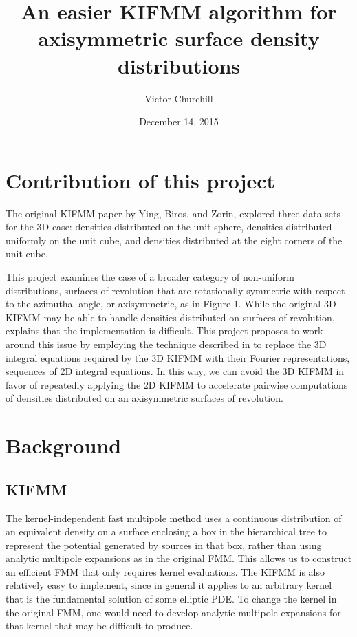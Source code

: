 \documentclass[12pt,letterpaper]{article}
\begin{document}

\title{An easier KIFMM algorithm for\\axisymmetric surface density distributions}
\date{December 14, 2015}
\author{Victor Churchill}
\clearpage
\maketitle
\thispagestyle{empty}

\newpage

\section{Contribution of this project}

The original KIFMM paper by Ying, Biros, and Zorin, explored three data sets for the 3D case: densities distributed on the unit sphere, densities distributed uniformly on the unit cube, and densities distributed at the eight corners of the unit cube.

This project examines the case of a broader category of non-uniform distributions, surfaces of revolution that are rotationally symmetric with respect to the azimuthal angle, or axisymmetric, as in Figure 1. While the original 3D KIFMM may be able to handle densities distributed on surfaces of revolution, \cite{YBZ} explains that the implementation is difficult. This project proposes to work around this issue by employing the technique described in \cite{YYM} to replace the 3D integral equations required by the 3D KIFMM with their Fourier representations, sequences of 2D integral equations. In this way, we can avoid the 3D KIFMM in favor of repeatedly applying the 2D KIFMM to accelerate pairwise computations of densities distributed on an axisymmetric surfaces of revolution.

\section{Background}

\subsection{KIFMM}
The kernel-independent fast multipole method uses a continuous distribution of an equivalent density on a surface enclosing a box in the hierarchical tree to represent the potential generated by sources in that box, rather than using analytic multipole expansions as in the original FMM. This allows us to construct an efficient FMM that only requires kernel evaluations. The KIFMM is also relatively easy to implement, since in general it applies to an arbitrary kernel that is the fundamental solution of some elliptic PDE. To change the kernel in the original FMM, one would need to develop analytic multipole expansions for that kernel that may be difficult to produce.
\end{document}
